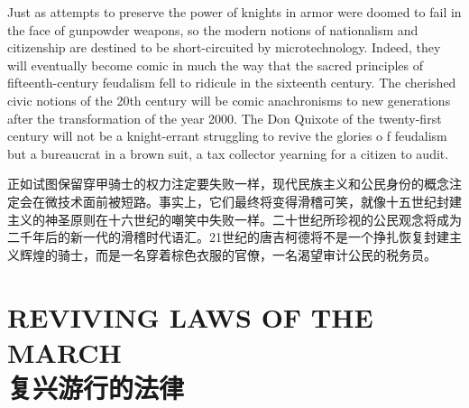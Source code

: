 \begin{paracol}{2}[]
	\switchcolumn*
	Just as attempts to preserve the power of knights in armor were doomed to fail in the face of gunpowder weapons, so the modern notions of nationalism and citizenship are destined to be short-circuited by microtechnology. Indeed, they will eventually become comic in much the way that the sacred principles of fifteenth-century feudalism fell to ridicule in the sixteenth century. The cherished civic notions of the 20th century will be comic anachronisms to new generations after the transformation of the year 2000. The Don Quixote of the twenty-first century will not be a knight-errant struggling to revive the glories o f feudalism but a bureaucrat in a brown suit, a tax collector yearning for a citizen to audit.
	
	\switchcolumn
	正如试图保留穿甲骑士的权力注定要失败一样，现代民族主义和公民身份的概念注定会在微技术面前被短路。事实上，它们最终将变得滑稽可笑，就像十五世纪封建主义的神圣原则在十六世纪的嘲笑中失败一样。二十世纪所珍视的公民观念将成为二千年后的新一代的滑稽时代语汇。21世纪的唐吉柯德将不是一个挣扎恢复封建主义辉煌的骑士，而是一名穿着棕色衣服的官僚，一名渴望审计公民的税务员。
	
\end{paracol}


\section[复兴游行的法律]{REVIVING LAWS OF THE MARCH\\复兴游行的法律}

